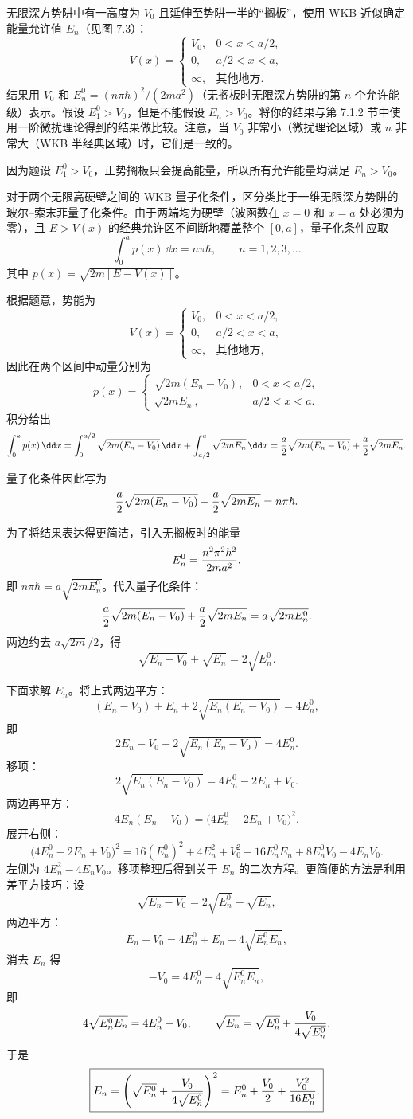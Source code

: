 \begin{question}
无限深方势阱中有一高度为 $V_0$ 且延伸至势阱一半的“搁板”，使用 WKB 近似确定能量允许值 $E_n$（见图 7.3）：
\[
V(x)=\begin{cases}
V_0, & 0<x<a/2,\\
0, & a/2<x<a,\\
\infty, & \text{其他地方}.
\end{cases}
\]
结果用 $V_0$ 和 $E_n^0=(n\pi\hbar)^2/(2ma^2)$（无搁板时无限深方势阱的第 $n$ 个允许能级）表示。假设 $E_1^0>V_0$，但是不能假设 $E_n>V_0$。将你的结果与第 7.1.2 节中使用一阶微扰理论得到的结果做比较。注意，当 $V_0$ 非常小（微扰理论区域）或 $n$ 非常大（WKB 半经典区域）时，它们是一致的。
\end{question}
\begin{solution}
因为题设 $E_1^0>V_0$，正势搁板只会提高能量，所以所有允许能量均满足 $E_n>V_0$。

对于两个无限高硬壁之间的 WKB 量子化条件，区分类比于一维无限深方势阱的玻尔--索末菲量子化条件。由于两端均为硬壁（波函数在 $x=0$ 和 $x=a$ 处必须为零），且 $E>V(x)$ 的经典允许区不间断地覆盖整个 $[0,a]$，量子化条件应取
\[
\int_0^a p(x)\,\dd x=n\pi\hbar,
\qquad n=1,2,3,\ldots
\]
其中 $p(x)=\sqrt{2m[E-V(x)]}$。

根据题意，势能为
\[
V(x)=\begin{cases}
V_0, & 0<x<a/2,\\[2pt]
0, & a/2<x<a,\\[2pt]
\infty, & \text{其他地方},
\end{cases}
\]
因此在两个区间中动量分别为
\[
p(x)= \begin{cases}
\sqrt{2m(E_n-V_0)}, & 0<x<a/2,\\[4pt]
\sqrt{2mE_n}, & a/2<x<a.
\end{cases}
\]
积分给出
\[
\int_0^a p(x)\,\dd x
=\int_0^{a/2}\sqrt{2m(E_n-V_0)}\,\dd x
+\int_{a/2}^a\sqrt{2mE_n}\,\dd x
={a\over2}\sqrt{2m(E_n-V_0)}+{a\over2}\sqrt{2mE_n}.
\]

量子化条件因此写为
\[
{a\over2}\sqrt{2m(E_n-V_0)}+{a\over2}\sqrt{2mE_n}=n\pi\hbar.
\]

为了将结果表达得更简洁，引入无搁板时的能量
\[
E_n^0={n^2\pi^2\hbar^2\over2ma^2},
\]
即 $n\pi\hbar = a\sqrt{2mE_n^0}$。代入量子化条件：
\[
{a\over2}\sqrt{2m(E_n-V_0)}+{a\over2}\sqrt{2mE_n}
=a\sqrt{2mE_n^0}.
\]
两边约去 $a\sqrt{2m}/2$，得
\[
\sqrt{E_n-V_0}+\sqrt{E_n}=2\sqrt{E_n^0}.
\]

下面求解 $E_n$。将上式两边平方：
\[
(E_n-V_0)+E_n+2\sqrt{E_n(E_n-V_0)}=4E_n^0,
\]
即
\[
2E_n-V_0+2\sqrt{E_n(E_n-V_0)}=4E_n^0.
\]
移项：
\[
2\sqrt{E_n(E_n-V_0)}=4E_n^0-2E_n+V_0.
\]
两边再平方：
\[
4E_n(E_n-V_0)=\bigl(4E_n^0-2E_n+V_0\bigr)^2.
\]
展开右侧：
\[
\bigl(4E_n^0-2E_n+V_0\bigr)^2
=16(E_n^0)^2+4E_n^2+V_0^2-16E_n^0E_n+8E_n^0V_0-4E_nV_0.
\]
左侧为 $4E_n^2-4E_nV_0$。移项整理后得到关于 $E_n$ 的二次方程。更简便的方法是利用差平方技巧：设
\[
\sqrt{E_n-V_0}=2\sqrt{E_n^0}-\sqrt{E_n},
\]
两边平方：
\[
E_n-V_0=4E_n^0+E_n-4\sqrt{E_n^0E_n},
\]
消去 $E_n$ 得
\[
-V_0=4E_n^0-4\sqrt{E_n^0E_n},
\]
即
\[
4\sqrt{E_n^0E_n}=4E_n^0+V_0,
\qquad
\sqrt{E_n}=\sqrt{E_n^0}+{V_0\over4\sqrt{E_n^0}}.
\]
于是
\[
\boxed{E_n=\left(\sqrt{E_n^0}+{V_0\over4\sqrt{E_n^0}}\right)^2
=E_n^0+{V_0\over2}+{V_0^2\over16E_n^0}.}
\]


\end{solution}
